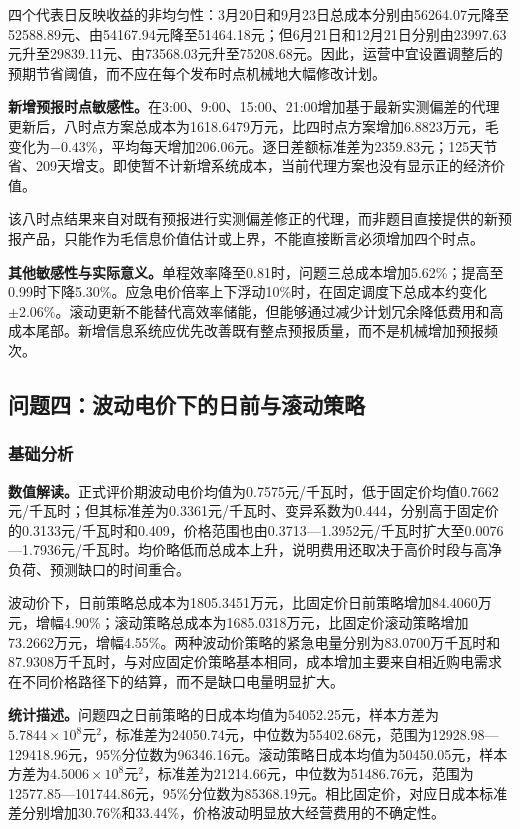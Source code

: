 \documentclass[UTF8,a4paper,12pt,fontset=fandol]{ctexart}
\numberwithin{equation}{section}
\begin{document}
四个代表日反映收益的非均匀性：3月20日和9月23日总成本分别由56264.07元降至52588.89元、由54167.94元降至51464.18元；但6月21日和12月21日分别由23997.63元升至29839.11元、由73568.03元升至75208.68元。因此，运营中宜设置调整后的预期节省阈值，而不应在每个发布时点机械地大幅修改计划。

\textbf{新增预报时点敏感性。}在3:00、9:00、15:00、21:00增加基于最新实测偏差的代理更新后，八时点方案总成本为1618.6479万元，比四时点方案增加6.8823万元，毛变化为$-0.43\%$，平均每天增加206.06元。逐日差额标准差为2359.83元；125天节省、209天增支。即使暂不计新增系统成本，当前代理方案也没有显示正的经济价值。

该八时点结果来自对既有预报进行实测偏差修正的代理，而非题目直接提供的新预报产品，只能作为毛信息价值估计或上界，不能直接断言必须增加四个时点。

\textbf{其他敏感性与实际意义。}单程效率降至0.81时，问题三总成本增加5.62\%；提高至0.99时下降5.30\%。应急电价倍率上下浮动10\%时，在固定调度下总成本约变化$\pm2.06\%$。滚动更新不能替代高效率储能，但能够通过减少计划冗余降低费用和高成本尾部。新增信息系统应优先改善既有整点预报质量，而不是机械增加预报频次。

\subsection{问题四：波动电价下的日前与滚动策略}

\subsubsection{基础分析}

\textbf{数值解读。}正式评价期波动电价均值为0.7575元/千瓦时，低于固定价均值0.7662元/千瓦时；但其标准差为0.3361元/千瓦时、变异系数为0.444，分别高于固定价的0.3133元/千瓦时和0.409，价格范围也由0.3713---1.3952元/千瓦时扩大至0.0076---1.7936元/千瓦时。均价略低而总成本上升，说明费用还取决于高价时段与高净负荷、预测缺口的时间重合。

波动价下，日前策略总成本为1805.3451万元，比固定价日前策略增加84.4060万元，增幅4.90\%；滚动策略总成本为1685.0318万元，比固定价滚动策略增加73.2662万元，增幅4.55\%。两种波动价策略的紧急电量分别为83.0700万千瓦时和87.9308万千瓦时，与对应固定价策略基本相同，成本增加主要来自相近购电需求在不同价格路径下的结算，而不是缺口电量明显扩大。

\textbf{统计描述。}问题四之日前策略的日成本均值为54052.25元，样本方差为$5.7844\times10^8$元$^2$，标准差为24050.74元，中位数为55402.68元，范围为12928.98---129418.96元，95\%分位数为96346.16元。滚动策略日成本均值为50450.05元，样本方差为$4.5006\times10^8$元$^2$，标准差为21214.66元，中位数为51486.76元，范围为12577.85---101744.86元，95\%分位数为85368.19元。相比固定价，对应日成本标准差分别增加30.76\%和33.44\%，价格波动明显放大经营费用的不确定性。
\end{document}
